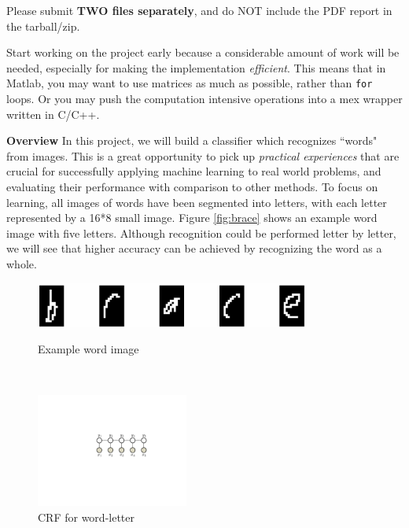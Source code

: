 \documentclass[11pt]{report}
\begin{document}
	Please submit {\bf TWO files separately}, and do NOT include the PDF report in the tarball/zip.
	
	
	Start working on the project early
	because a considerable amount of work will be needed,
	especially for making the implementation \emph{efficient}.
	This means that in Matlab, you may want to use matrices as much as possible,
	rather than \verb#for# loops.
	Or you may push the computation intensive operations into a mex wrapper written in C/C++.

	
	
	
	{\bf \large Overview}	
	In this project, we will build a classifier which recognizes ``words" from images.
	This is a great opportunity to pick up \emph{practical experiences} that are crucial for successfully applying machine learning to real world problems,
	and evaluating their performance with comparison to other methods.
	To focus on learning, all images of words have been segmented into letters,
	with each letter represented by a 16*8 small image.
	Figure \ref{fig:brace} shows an example word image with five letters.
	Although recognition could be performed letter by letter,
	we will see that higher accuracy can be achieved by recognizing the word as a whole.
	
	
	\begin{figure}[t!]
		\begin{minipage}[b]{0.62\textwidth}
			\centering
			\vspace{-0.6em}
			\includegraphics[width=9cm]{brace.jpg}
			\vspace{0.6em}
			\caption{Example word image}\label{fig:brace}
		\end{minipage}
		~~~
		\begin{minipage}[b]{0.33\textwidth}
			\centering
			\includegraphics[width=5cm]{crf}
			\caption{CRF for word-letter}\label{fig:CRF_model}
		\end{minipage}
	\end{figure}
	
\end{document}
